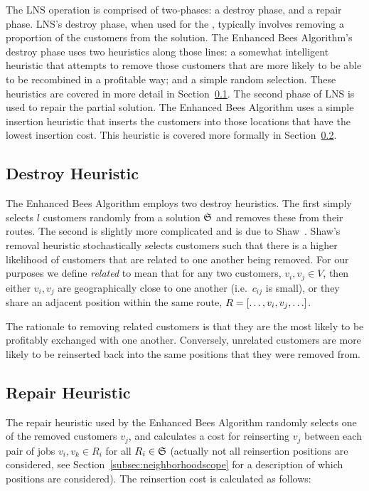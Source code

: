 The LNS operation is comprised of two-phases: a destroy phase, and a repair phase. LNS's destroy phase, when used for the \VRP, typically involves removing a proportion of the customers from the solution. The Enhanced Bees Algorithm's destroy phase uses two heuristics along those lines: a somewhat intelligent heuristic that attempts to remove those customers that are more likely to be able to be recombined in a profitable way; and a simple random selection. These heuristics are covered in more detail in Section~\ref{subsec:destroyheuristic}. The second phase of LNS is used to repair the partial solution. The Enhanced Bees Algorithm uses a simple insertion heuristic that inserts the customers into those locations that have the lowest insertion cost. This heuristic is covered more formally in Section~\ref{subsec:repairheuristic}.

\subsection{Destroy Heuristic}
\label{subsec:destroyheuristic}

The Enhanced Bees Algorithm employs two destroy heuristics. The first simply selects $l$ customers randomly from a solution $\mathfrak{S}$ and removes these from their routes. The second is slightly more complicated and is due to Shaw~\cite{Shaw:1998}. Shaw's removal heuristic stochastically selects customers such that there is a higher likelihood of customers that are related to one another being removed. For our purposes we define \emph{related} to mean that for any two customers, $v_i, v_j \in V$, then either $v_i, v_j$ are geographically close to one another (i.e.~$c_{ij}$ is small), or they share an adjacent position within the same route, $R = [\ldots, v_i, v_j,\ldots]$.

The rationale to removing related customers is that they are the most likely to be profitably exchanged with one another. Conversely, unrelated customers are more likely to be reinserted back into the same positions that they were removed from. 

\subsection{Repair Heuristic}
\label{subsec:repairheuristic}

The repair heuristic used by the Enhanced Bees Algorithm randomly selects one of the removed customers $v_j$, and calculates a cost for reinserting $v_j$ between each pair of jobs $v_i, v_k \in R_i$ for all $R_i \in \mathfrak{S}$ (actually not all reinsertion positions are considered, see Section~\ref{subsec:neighborhoodscope} for a description of which positions are considered). The reinsertion cost is calculated as follows:

